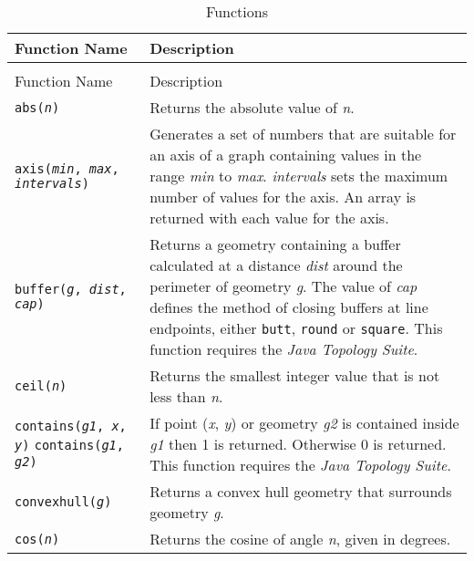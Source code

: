 \begin{longtable}{|p{5cm}|p{7cm}|}
\hline
\label{functions}
Function Name & Description \\
\hline
\hline
\endfirsthead
\hline
\caption{Functions} \\
\endfoot

\hline
Function Name & Description \\
\hline
\hline
\endhead

\texttt{abs(\textit{n})} &
Returns the absolute value of \textit{n}. \\

\hline

\texttt{axis(\textit{min}, \textit{max}, \textit{intervals})} &
Generates a set of numbers that are suitable for an axis of a graph
containing values in the range \textit{min} to \textit{max}.
\textit{intervals} sets the maximum number of values for the axis.
An array is returned with each value for the axis. \\

\hline

\texttt{buffer(\textit{g}, \textit{dist}, \textit{cap})} &
Returns a geometry containing a buffer calculated at
a distance \textit{dist} around the perimeter of geometry \textit{g}.
The value of \textit{cap} defines
the method of closing buffers at line endpoints, either
\texttt{butt}, \texttt{round} or \texttt{square}.
This function requires the \textit{Java Topology Suite}. \\

\hline

\texttt{ceil(\textit{n})} &
Returns the smallest integer value that is not less than \textit{n}. \\

\hline

\texttt{contains(\textit{g1}, \textit{x}, \textit{y})}
\texttt{contains(\textit{g1}, \textit{g2})} &
If point (\textit{x}, \textit{y}) or geometry \textit{g2}
is contained inside \textit{g1} then
1 is returned.  Otherwise 0 is returned.
This function requires the \textit{Java Topology Suite}. \\

\hline

\texttt{convexhull(\textit{g})} &
Returns a convex hull geometry that surrounds geometry \textit{g}. \\

\hline

\texttt{cos(\textit{n})} &
Returns the cosine of angle \textit{n}, given in degrees. \\


\end{longtable}
